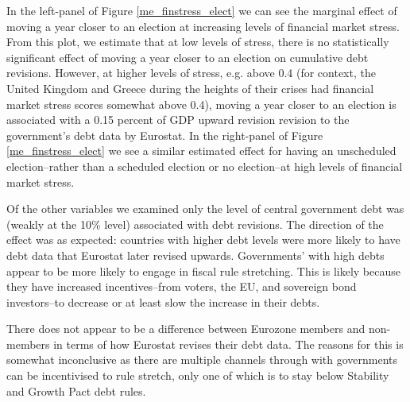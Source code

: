 \documentclass[]{article}
\begin{document}
In the left-panel of Figure \ref{me_finstress_elect} we can see the marginal effect of moving a year closer to an election at increasing levels of financial market stress. From this plot, we estimate that at low levels of stress, there is no statistically significant effect of moving a year closer to an election on cumulative debt revisions. However, at higher levels of stress, e.g. above 0.4 (for context, the United Kingdom and Greece during the heights of their crises had financial market stress scores somewhat above 0.4), moving a year closer to an election is associated with a 0.15 percent of GDP upward revision revision to the government's debt data by Eurostat. In the right-panel of Figure \ref{me_finstress_elect} we see a similar estimated effect for having an unscheduled election--rather than a scheduled election or no election--at high levels of financial market stress.

Of the other variables we examined only the level of central government debt was (weakly at the 10\% level) associated with debt revisions. The direction of the effect was as expected: countries with higher debt levels were more likely to have debt data that Eurostat later revised upwards. Governments' with high debts appear to be more likely to engage in fiscal rule stretching. This is likely because they have increased incentives--from voters, the EU, and sovereign bond investors--to decrease or at least slow the increase in their debts.

There does not appear to be a difference between Eurozone members and non-members in terms of how Eurostat revises their debt data. The reasons for this is somewhat inconclusive as there are multiple channels through with governments can be incentivised to rule stretch, only one of which is to stay below Stability and Growth Pact debt rules.

\end{document}

